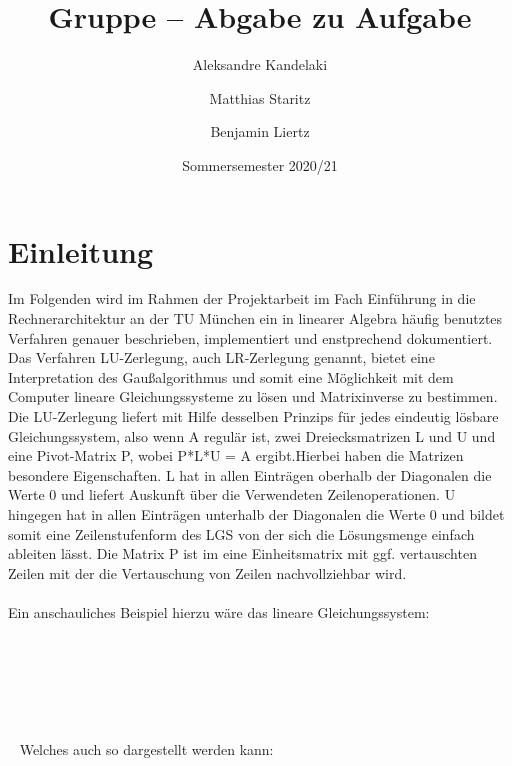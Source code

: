 \documentclass[course=erap]{aspdoc}
\author{⁨Aleksandre Kandelaki \and Matthias Staritz \and Benjamin Liertz}
\date{Sommersemester 2020/21} %
\title{Gruppe \theGroup{} -- Abgabe zu Aufgabe \theNumber}
\begin{document}
\maketitle

\section{Einleitung}

\noindent\hspace*{15mm}%
Im Folgenden wird im Rahmen der Projektarbeit im Fach Einführung
in die Rechnerarchitektur an der TU München ein in linearer Algebra häufig 
benutztes Verfahren genauer beschrieben, implementiert und enstprechend dokumentiert.\\

\noindent\hspace*{15mm}%
Das Verfahren LU-Zerlegung, auch LR-Zerlegung genannt, bietet eine Interpretation des Gaußalgorithmus 
	 und somit eine Möglichkeit mit dem Computer lineare Gleichungssysteme zu 
	 lösen und Matrixinverse zu bestimmen.\\
 
\noindent\hspace*{15mm}%
Die LU-Zerlegung liefert mit Hilfe desselben Prinzips für jedes
   eindeutig lösbare Gleichungssystem, also wenn A regulär ist, zwei Dreiecksmatrizen L und 
   U und eine Pivot-Matrix P, wobei P*L*U = A ergibt.Hierbei haben die Matrizen besondere 
   Eigenschaften. L hat in allen Einträgen oberhalb der Diagonalen die Werte 0 und liefert 
   Auskunft über die Verwendeten Zeilenoperationen. U hingegen hat in allen Einträgen unterhalb
    der Diagonalen die Werte 0 und bildet somit eine Zeilenstufenform des LGS von der sich die 
    Lösungsmenge einfach ableiten lässt. Die Matrix P ist im eine Einheitsmatrix mit ggf. 
    vertauschten Zeilen mit der die Vertauschung von Zeilen nachvollziehbar wird.\\\\
    

\noindent\hspace*{15mm}%
Ein anschauliches Beispiel hierzu wäre das lineare Gleichungssystem:
\\\\\\\\\\\\\\\
\noindent\hspace*{15mm}%
Welches auch so dargestellt werden kann:  
\\\\\\\\\\\\\\\
\end{document}
